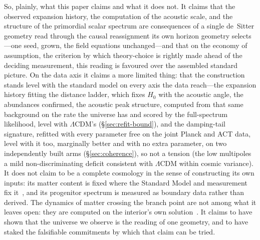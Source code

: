 \documentclass[11pt,a4paper]{article}
\theoremstyle{plain}
\theoremstyle{definition}
\theoremstyle{remark}
\begin{document}
So, plainly, what this paper claims and what it does not. It claims that the observed expansion history, the computation of the acoustic scale, and the structure of the primordial scalar spectrum are consequences of a single de~Sitter geometry read through the causal reassignment its own horizon geometry selects---one seed, grown, the field equations unchanged---and that on the economy of assumption, the criterion by which theory-choice is rightly made ahead of the deciding measurement, this reading is favoured over the assembled standard picture. On the data axis it claims a more limited thing: that the construction stands level with the standard model on every axis the data reach---the expansion history fitting the distance ladder, which fixes $H_0$ with the acoustic angle, the abundances confirmed, the acoustic peak structure, computed from that same background on the rate the universe has and scored by the full-spectrum likelihood, level with $\Lambda$CDM's (\S\ref{sec:refit-bound}), and the damping-tail signature, refitted with every parameter free on the joint Planck and ACT data, level with it too, marginally better and with no extra parameter, on two independently built arms (\S\ref{sec:coherence}), so not a tension (the low multipoles a mild non-discriminating deficit consistent with $\Lambda$CDM within cosmic variance). It does not claim to be a complete cosmology in the sense of constructing its own inputs: its matter content is fixed where the Standard Model and measurement fix it~\cite{JanzenMatter}, and its progenitor spectrum is measured as boundary data rather than derived. The dynamics of matter crossing the branch point are not among what it leaves open: they are computed on the interior's own solution~\cite{JanzenCosmogenesis}. It claims to have shown that the universe we observe is the reading of one geometry, and to have staked the falsifiable commitments by which that claim can be tried.
\end{document}
